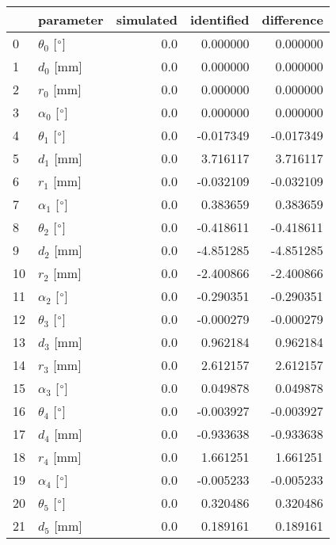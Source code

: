 \documentclass{standalone}%
\begin{document}
%
\normalsize%
\begin{tabular}{llrrr}
\toprule
{} &                 parameter & simulated & identified & difference \\
\midrule
0  &  $\theta_{0}$ [$\degree$] &       0.0 &   0.000000 &   0.000000 \\
1  &              $d_{0}$ [mm] &       0.0 &   0.000000 &   0.000000 \\
2  &              $r_{0}$ [mm] &       0.0 &   0.000000 &   0.000000 \\
3  &  $\alpha_{0}$ [$\degree$] &       0.0 &   0.000000 &   0.000000 \\
4  &  $\theta_{1}$ [$\degree$] &       0.0 &  -0.017349 &  -0.017349 \\
5  &              $d_{1}$ [mm] &       0.0 &   3.716117 &   3.716117 \\
6  &              $r_{1}$ [mm] &       0.0 &  -0.032109 &  -0.032109 \\
7  &  $\alpha_{1}$ [$\degree$] &       0.0 &   0.383659 &   0.383659 \\
8  &  $\theta_{2}$ [$\degree$] &       0.0 &  -0.418611 &  -0.418611 \\
9  &              $d_{2}$ [mm] &       0.0 &  -4.851285 &  -4.851285 \\
10 &              $r_{2}$ [mm] &       0.0 &  -2.400866 &  -2.400866 \\
11 &  $\alpha_{2}$ [$\degree$] &       0.0 &  -0.290351 &  -0.290351 \\
12 &  $\theta_{3}$ [$\degree$] &       0.0 &  -0.000279 &  -0.000279 \\
13 &              $d_{3}$ [mm] &       0.0 &   0.962184 &   0.962184 \\
14 &              $r_{3}$ [mm] &       0.0 &   2.612157 &   2.612157 \\
15 &  $\alpha_{3}$ [$\degree$] &       0.0 &   0.049878 &   0.049878 \\
16 &  $\theta_{4}$ [$\degree$] &       0.0 &  -0.003927 &  -0.003927 \\
17 &              $d_{4}$ [mm] &       0.0 &  -0.933638 &  -0.933638 \\
18 &              $r_{4}$ [mm] &       0.0 &   1.661251 &   1.661251 \\
19 &  $\alpha_{4}$ [$\degree$] &       0.0 &  -0.005233 &  -0.005233 \\
20 &  $\theta_{5}$ [$\degree$] &       0.0 &   0.320486 &   0.320486 \\
21 &              $d_{5}$ [mm] &       0.0 &   0.189161 &   0.189161 \\

\end{tabular}
\end{document}
